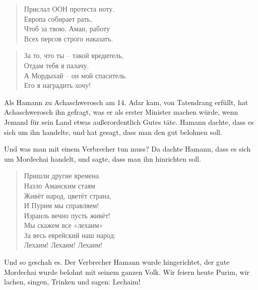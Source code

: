 \documentclass[12pt,a4paper,titlepage]{article}
\begin{document}
\begin{drama}
\begin{verse}
Прислал ООН протеста ноту.\\
Европа собирает рать,\\
Чтоб за твою, Аман, работу\\
Всех персов строго наказать.\\
\end{verse}

\begin{verse}
За то, что ты -- такой вредитель,\\
Отдам тебя я палачу.\\
А Мордыхай -- он мой спаситель.\\
Его я наградить хочу!\\
\end{verse}


\uespeaks
Als Hamann zu Achaschwerosch am 14. Adar kam, von Tatendrang  erfüllt,
hat Achaschwerosch ihn gefragt, was er als erster Minister machen würde,
wenn Jemand für sein Land etwas außerordentlich Gutes täte. Hamann dachte,
dass es sich um ihn handelte, und hat gesagt, dass man den gut belohnen soll.
\par Und was man mit einem Verbrecher tun muss? Da dachte Hamann, dass es sich
um Mordechai handelt, und sagte, dass man ihn hinrichten soll.


\scene


\mspeaks
\begin{verse}
Пришли другие времена.\\
Назло Аманским стаям\\
Живёт народ, цветёт страна,\\
И Пурим мы справляем!\\
Израиль  вечно пусть живёт!\\
Мы скажем все «лехаим»\\
За весь еврейский наш народ:\\
Лехаим! Лехаим! Лехаим!\\
\end{verse}


\uespeaks
Und so geschah es. Der Verbrecher Hamann wurde hingerichtet,
der gute Mordechai wurde belohnt mit seinem ganzen Volk. 
Wir feiern heute Purim, wir lachen, singen, Trinken und sagen: Lechaim!


\end{drama}
\end{document}
